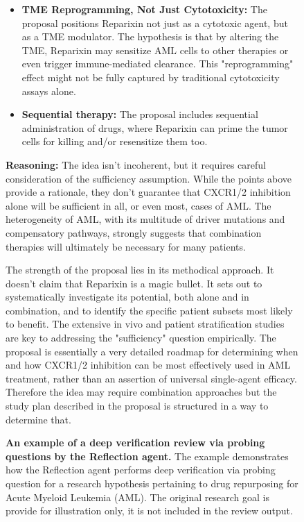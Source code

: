 \begin{figure}[htbp!]
\begin{tcolorbox}
\begin{itemize}
    \item \textbf{TME Reprogramming, Not Just Cytotoxicity:} The proposal positions Reparixin not just as a cytotoxic agent, but as a TME modulator. The hypothesis is that by altering the TME, Reparixin may sensitize AML cells to other therapies or even trigger immune-mediated clearance. This "reprogramming" effect might not be fully captured by traditional cytotoxicity assays alone.
    \item \textbf{Sequential therapy:} The proposal includes sequential administration of drugs, where Reparixin can prime the tumor cells for killing and/or resensitize them too.
\end{itemize}
\textbf{Reasoning:} The idea isn't incoherent, but it requires careful consideration of the sufficiency assumption. While the points above provide a rationale, they don't guarantee that CXCR1/2 inhibition alone will be sufficient in all, or even most, cases of AML. The heterogeneity of AML, with its multitude of driver mutations and compensatory pathways, strongly suggests that combination therapies will ultimately be necessary for many patients.

The strength of the proposal lies in its methodical approach. It doesn't claim that Reparixin is a magic bullet. It sets out to systematically investigate its potential, both alone and in combination, and to identify the specific patient subsets most likely to benefit. The extensive in vivo and patient stratification studies are key to addressing the "sufficiency" question empirically. The proposal is essentially a very detailed roadmap for determining when and how CXCR1/2 inhibition can be most effectively used in AML treatment, rather than an assertion of universal single-agent efficacy. Therefore the idea may require combination approaches but the study plan described in the proposal is structured in a way to determine that.
\end{tcolorbox}
\vspace{0.1cm}
\caption{\textbf{An example of a deep verification review via probing questions by the Reflection agent.} The example demonstrates how the Reflection agent performs deep verification via probing question for a research hypothesis pertaining to drug repurposing for Acute Myeloid Leukemia (AML). The original research goal is provide for illustration only, it is not included in the review output.}
\label{fig:ex_deep_verification_probe}
\end{figure}


